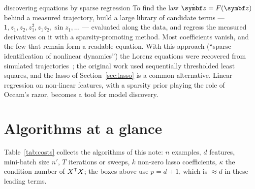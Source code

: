 \documentclass[11pt]{article}
\begin{document}
\begin{physics}{discovering equations by sparse regression}
To find the law $\dot{\vect{z}} = F(\vect{z})$ behind a measured trajectory, build a large library of candidate terms ---
$1, z_1, z_2, z_1^2, z_1 z_2, \sin z_1, \dots$ --- evaluated along the data, and regress the measured derivatives on it with
a sparsity-promoting method. Most coefficients vanish, and the few that remain form a readable equation. With this approach
(``sparse identification of nonlinear dynamics'') the Lorenz equations were recovered from simulated
trajectories~\cite{brunton2016}; the original work used sequentially thresholded least squares, and the lasso of
Section~\ref{sec:lasso} is a common alternative.
Linear regression on non-linear features, with a sparsity prior playing the role of Occam's razor, becomes a tool for
model discovery.
\end{physics}

\section{Algorithms at a glance}\label{sec:glance}

Table~\ref{tab:costs} collects the algorithms of this note: $n$ examples, $d$ features, mini-batch size $n'$, $T$
iterations or sweeps, $k$ non-zero lasso coefficients, $\kappa$ the condition number of $X^{\mathsf{T}} X$; the boxes above use
$p = d + 1$, which is $\approx d$ in these leading terms.
\end{document}
